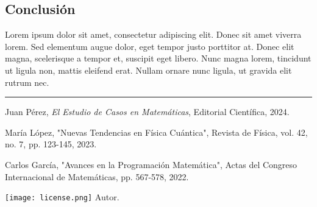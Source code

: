 \documentclass[a4paper, 10pt]{article}
\begin{document}
\begin{multicols}{2}
		\section{Conclusión}
		Lorem ipsum dolor sit amet, consectetur adipiscing elit. Donec sit amet viverra lorem. Sed elementum augue dolor, eget tempor justo porttitor at. Donec elit magna, scelerisque a tempor et, suscipit eget libero. Nunc magna lorem, tincidunt ut ligula non, mattis eleifend erat. Nullam ornare nunc ligula, ut gravida elit rutrum nec.
	\end{multicols}
	
	\vspace{1em} %
	\hrule %
	\vspace{1em} %
	
	\renewcommand{\refname}{Referencias} %
	\begin{thebibliography}{9}
		Juan Pérez,
		\textit{El Estudio de Casos en Matemáticas},
		Editorial Científica, 2024.
		
		María López,
		"Nuevas Tendencias en Física Cuántica",
		Revista de Física, vol. 42, no. 7, pp. 123-145, 2023.
		
		Carlos García,
		"Avances en la Programación Matemática",
		Actas del Congreso Internacional de Matemáticas, pp. 567-578, 2022.
	\end{thebibliography}

        \vspace{0.5em}

        \begin{minipage}[t]{0.2\textwidth} %
		\centering
		\texttt{[image: license.png]} %
		\vspace{0.5em}
		\small {} Autor.
	\end{minipage}
	
\end{document}
